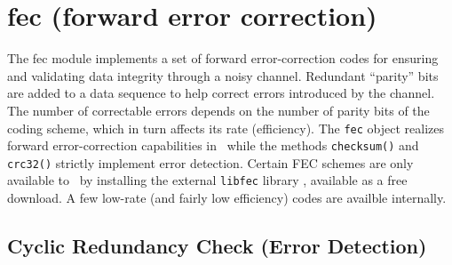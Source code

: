 % 
%

\newpage
\section{fec (forward error correction)}
\label{module:fec}
The fec module implements a set of forward error-correction codes for
ensuring and validating data integrity through a noisy channel.
Redundant ``parity'' bits are added to a data sequence to help correct
errors introduced by the channel.
The number of correctable errors depends on the number of parity bits of the
coding scheme, which in turn affects its rate (efficiency).
The {\tt fec} object realizes forward error-correction capabilities in
\liquid\ while the methods {\tt checksum()} and {\tt crc32()} strictly
implement error detection.
Certain FEC schemes are only available to \liquid\ by installing the external
{\tt libfec} library \cite{libfec:web}, available as a free download.
A few low-rate (and fairly low efficiency) codes are availble internally.


\subsection{Cyclic Redundancy Check (Error Detection)}
\label{module:fec:crc}

